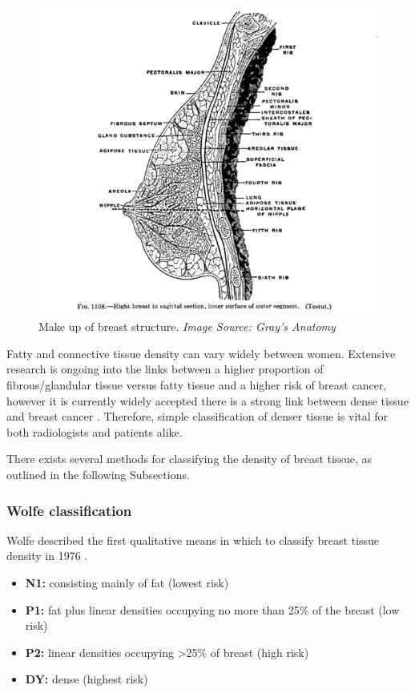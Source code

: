\begin{figure}[!h]
  \center
  \includegraphics[scale=0.4]{Chapter1/background-img/breast_anatomy.png}
  \caption{Make up of breast structure. \textit{Image Source: Gray's Anatomy \cite{Gray_1907}}}
  \label{fig:breast-anatomy}
\end{figure}

Fatty and connective tissue density can vary widely between women. Extensive research is ongoing into the links between a higher proportion of fibrous/glandular tissue versus fatty tissue and a higher risk of breast cancer, however it is currently widely accepted there is a strong link between dense tissue and breast cancer \cite{Boyd_Byng_Jong_Fishell_Little_Miller_Lockwood_Tritchler_Yaffe_1995}. Therefore, simple classification of denser tissue is vital for both radiologists and patients alike.

There exists several methods for classifying the density of breast tissue, as outlined in the following Subsections.

\subsubsection{Wolfe classification}

Wolfe described the first qualitative means in which to classify breast tissue density in 1976 \cite{Wolfe_1976}.

\begin{itemize}
    \item \textbf{N1:} consisting mainly of fat (lowest risk)
    \item \textbf{P1:} fat plus linear densities occupying no more than 25\% of the breast (low risk)
    \item \textbf{P2:} linear densities occupying \textgreater 25\% of breast (high risk)
    \item \textbf{DY:} dense (highest risk)
\end{itemize}

